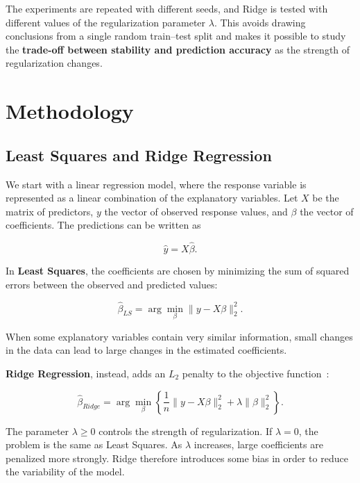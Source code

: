 \documentclass[11pt,a4paper]{article}
\begin{document}
The experiments are repeated with different seeds, and Ridge is tested with different values of the regularization parameter $\lambda$. This avoids drawing conclusions from a single random train--test split and makes it possible to study the \textbf{trade-off between stability and prediction accuracy} as the strength of regularization changes.

\section{Methodology}

\subsection{Least Squares and Ridge Regression}
We start with a linear regression model, where the response variable is represented as a linear combination of the explanatory variables. Let $X$ be the matrix of predictors, $y$ the vector of observed response values, and $\beta$ the vector of coefficients. The predictions can be written as

\begin{equation}
    \hat{y} = X\hat{\beta}.
\end{equation}

In \textbf{Least Squares}, the coefficients are chosen by minimizing the sum of squared errors between the observed and predicted values:

\begin{equation}
    \hat{\beta}_{LS}
    = \arg\min_{\beta} \|y-X\beta\|_2^2.
\end{equation}

When some explanatory variables contain very similar information, small changes in the data can lead to large changes in the estimated coefficients.

\textbf{Ridge Regression}, instead, adds an $L_2$ penalty to the objective function~\cite{hoerl1970ridge}:

\begin{equation}
    \hat{\beta}_{Ridge}
    = \arg\min_{\beta}
    \left\{
    \frac{1}{n}\|y-X\beta\|_2^2 + \lambda\|\beta\|_2^2
    \right\}.
\end{equation}

The parameter $\lambda \geq 0$ controls the strength of regularization. If $\lambda=0$, the problem is the same as Least Squares. As $\lambda$ increases, large coefficients are penalized more strongly. Ridge therefore introduces some bias in order to reduce the variability of the model.
\end{document}
